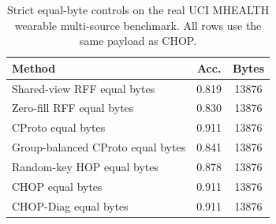 \begin{table}[t]
\centering
\caption{Strict equal-byte controls on the real UCI MHEALTH wearable multi-source benchmark. All rows use the same payload as CHOP.}
\label{tab:strict-equal-byte-mhealth}
\begin{tabular}{lcc}
\toprule
Method & Acc. & Bytes \\
\midrule
Shared-view RFF equal bytes & 0.819 & 13876 \\
Zero-fill RFF equal bytes & 0.830 & 13876 \\
CProto equal bytes & 0.911 & 13876 \\
Group-balanced CProto equal bytes & 0.841 & 13876 \\
Random-key HOP equal bytes & 0.878 & 13876 \\
CHOP equal bytes & 0.911 & 13876 \\
CHOP-Diag equal bytes & 0.911 & 13876 \\
\bottomrule
\end{tabular}
\end{table}
